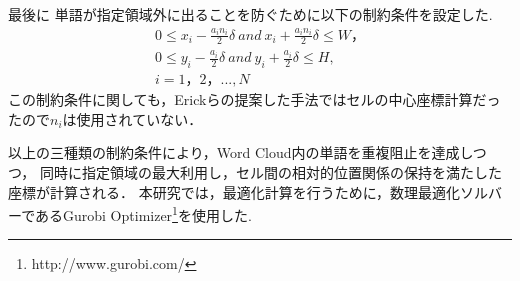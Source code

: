 \documentclass[syuuron]{kuee}
\begin{document}
				最後に 単語が指定領域外に出ることを防ぐために以下の制約条件を設定した.
				\begin{eqnarray}
					0 \le x_i  -  \frac{a_i n_i} {2} \delta \:  and \:  x_i  +  \frac{a_i n_i} {2} \delta \le W，\nonumber \\
					0 \le y_i  -  \frac{a_i} {2} \delta  \: and \:  y_i  +  \frac{a_i} {2} \delta \le H ,\\
					i = 1，2，...,N\nonumber
				\end{eqnarray}
				この制約条件に関しても，Erickらの提案した手法ではセルの中心座標計算だったので$n_i$は使用されていない．
				
				以上の三種類の制約条件により，Word Cloud内の単語を重複阻止を達成しつつ，
				同時に指定領域の最大利用し，セル間の相対的位置関係の保持を満たした座標が計算される．
				本研究では，最適化計算を行うために，数理最適化ソルバーであるGurobi Optimizer\footnote{http://www.gurobi.com/}を使用した.
	
\end{document}
